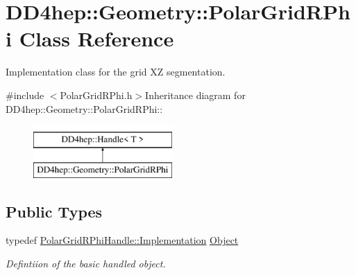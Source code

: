 \hypertarget{class_d_d4hep_1_1_geometry_1_1_polar_grid_r_phi}{
\section{DD4hep::Geometry::PolarGridRPhi Class Reference}
\label{class_d_d4hep_1_1_geometry_1_1_polar_grid_r_phi}
}


Implementation class for the grid XZ segmentation.  


{\ttfamily \#include $<$PolarGridRPhi.h$>$}Inheritance diagram for DD4hep::Geometry::PolarGridRPhi::\begin{figure}[H]
\begin{center}
\leavevmode
\includegraphics[height=2cm]{class_d_d4hep_1_1_geometry_1_1_polar_grid_r_phi}
\end{center}
\end{figure}
\subsection*{Public Types}
\begin{DoxyCompactItemize}
\item 
typedef \hyperlink{class_t}{PolarGridRPhiHandle::Implementation} \hyperlink{class_d_d4hep_1_1_geometry_1_1_polar_grid_r_phi_aebd15faef8872b8331cb2a153d5665bd}{Object}
\begin{DoxyCompactList}\small\item\em Defintiion of the basic handled object. \item\end{DoxyCompactList}\end{DoxyCompactItemize}
